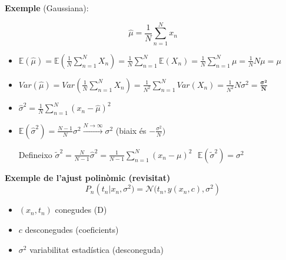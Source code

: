 \documentclass[a4paper]{article}
\begin{document}
\textbf{Exemple} (Gaussiana):

\[ \boxed{\hat{\mu}=\frac{1}{N}\sum_{n=1}^N x_n} \]

\begin{itemize}
	\item $\mathbb{E}(\hat{\mu}) = \mathbb{E}\left(\frac{1}{N}\sum_{n=1}^N X_n\right)=\frac{1}{N}\sum_{n=1}^N \mathbb{E}(X_n) = \frac{1}{N}\sum_{n=1}^N \mu = \frac{1}{N}N\mu = \mu$
	
	\item $Var(\hat{\mu}) = Var\left(\frac{1}{N}\sum_{n=1}^N X_n\right) = \frac{1}{N^2}\sum_{n=1}^N Var(X_n) = \frac{1}{N^2}N\sigma^2 = \boxed{ \boldsymbol{\frac{\sigma^2}{N}}}$
	
	\item $\hat{\sigma}^2 = \frac{1}{N}\sum_{n=1}^N(x_n-\hat{\mu})^2$
	
	\item $\mathbb{E}(\hat{\sigma}^2) = \frac{N-1}{N}\sigma^2 \xrightarrow{N\rightarrow\infty} \sigma^2$ (biaix és $-\frac{\sigma^2}{N})$
	
	Defineixo $\tilde{\sigma}^2 = \frac{N}{N-1}\hat{\sigma}^2 = \frac{1}{N-1}\sum_{n=1}^N(x_n - \mu)^2 \ \ \  \mathbb{E}(\tilde{\sigma}^2) = \sigma^2$
\end{itemize}


\textbf{Exemple de l'ajust polinòmic (revisitat)}
\[P_n\left(t_n|x_n, \sigma^2)=\mathcal{N}(t_n, y(x_n, c), \sigma^2\right)\]

\begin{itemize}
	\item $(x_n, t_n)$ conegudes (D)
	\item $c$ desconegudes (coeficients)
	\item $\sigma^2$ variabilitat estadística (desconeguda)
\end{itemize}
\end{document}
